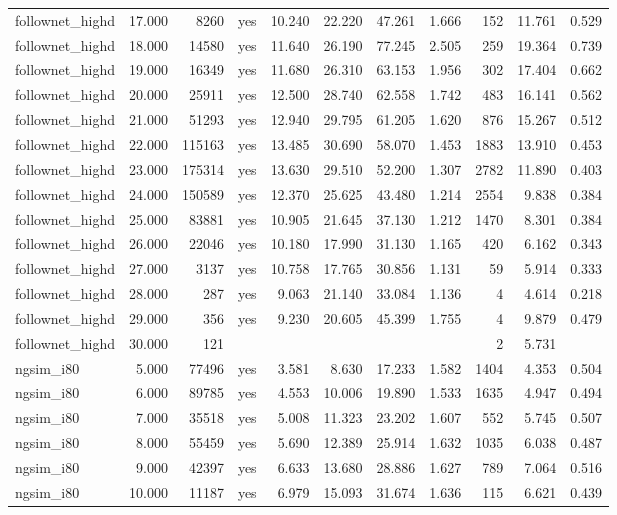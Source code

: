 \begin{table}[htbp]
{\begin{tabular}{lrrlrrrrrrr}
follownet\_highd & 17.000 & 8260 & yes & 10.240 & 22.220 & 47.261 & 1.666 & 152 & 11.761 & 0.529 \\
follownet\_highd & 18.000 & 14580 & yes & 11.640 & 26.190 & 77.245 & 2.505 & 259 & 19.364 & 0.739 \\
follownet\_highd & 19.000 & 16349 & yes & 11.680 & 26.310 & 63.153 & 1.956 & 302 & 17.404 & 0.662 \\
follownet\_highd & 20.000 & 25911 & yes & 12.500 & 28.740 & 62.558 & 1.742 & 483 & 16.141 & 0.562 \\
follownet\_highd & 21.000 & 51293 & yes & 12.940 & 29.795 & 61.205 & 1.620 & 876 & 15.267 & 0.512 \\
follownet\_highd & 22.000 & 115163 & yes & 13.485 & 30.690 & 58.070 & 1.453 & 1883 & 13.910 & 0.453 \\
follownet\_highd & 23.000 & 175314 & yes & 13.630 & 29.510 & 52.200 & 1.307 & 2782 & 11.890 & 0.403 \\
follownet\_highd & 24.000 & 150589 & yes & 12.370 & 25.625 & 43.480 & 1.214 & 2554 & 9.838 & 0.384 \\
follownet\_highd & 25.000 & 83881 & yes & 10.905 & 21.645 & 37.130 & 1.212 & 1470 & 8.301 & 0.384 \\
follownet\_highd & 26.000 & 22046 & yes & 10.180 & 17.990 & 31.130 & 1.165 & 420 & 6.162 & 0.343 \\
follownet\_highd & 27.000 & 3137 & yes & 10.758 & 17.765 & 30.856 & 1.131 & 59 & 5.914 & 0.333 \\
follownet\_highd & 28.000 & 287 & yes & 9.063 & 21.140 & 33.084 & 1.136 & 4 & 4.614 & 0.218 \\
follownet\_highd & 29.000 & 356 & yes & 9.230 & 20.605 & 45.399 & 1.755 & 4 & 9.879 & 0.479 \\
follownet\_highd & 30.000 & 121 &  &  &  &  &  & 2 & 5.731 &  \\
ngsim\_i80 & 5.000 & 77496 & yes & 3.581 & 8.630 & 17.233 & 1.582 & 1404 & 4.353 & 0.504 \\
ngsim\_i80 & 6.000 & 89785 & yes & 4.553 & 10.006 & 19.890 & 1.533 & 1635 & 4.947 & 0.494 \\
ngsim\_i80 & 7.000 & 35518 & yes & 5.008 & 11.323 & 23.202 & 1.607 & 552 & 5.745 & 0.507 \\
ngsim\_i80 & 8.000 & 55459 & yes & 5.690 & 12.389 & 25.914 & 1.632 & 1035 & 6.038 & 0.487 \\
ngsim\_i80 & 9.000 & 42397 & yes & 6.633 & 13.680 & 28.886 & 1.627 & 789 & 7.064 & 0.516 \\
ngsim\_i80 & 10.000 & 11187 & yes & 6.979 & 15.093 & 31.674 & 1.636 & 115 & 6.621 & 0.439 \\

\end{tabular}}
\end{table}
